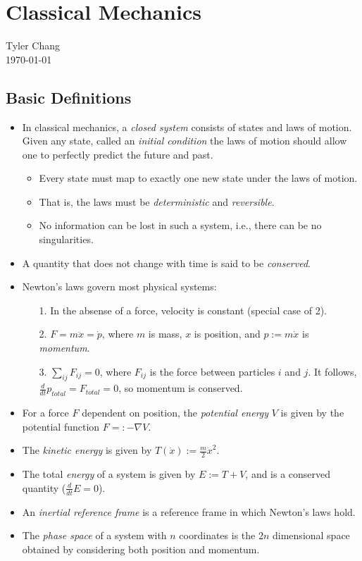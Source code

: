 \documentclass[12pt]{article}
\begin{document}
\section*{Classical Mechanics}
Tyler Chang\\
\today

\subsection*{Basic Definitions}

\begin{itemize}
\item In classical mechanics, a {\it closed system} consists of states and
laws of motion. Given any state, called an {\it initial condition} the laws
of motion should allow one to perfectly predict the future and past.
\begin{itemize}
\item Every state must map to exactly one new state under the laws of motion.
\item That is, the laws must be {\it deterministic} and {\it reversible}.
\item No information can be lost in such a system, i.e., there can be no
singularities.
\end{itemize}
\item A quantity that does not change with time is said to be {\it conserved}.
\item Newton's laws govern most physical systems:
\begin{enumerate}
\item[1.] In the absense of a force, velocity is constant (special case of 2).
\item[2.] $F = m\ddot{x} = \dot{p}$, where $m$ is mass, $x$ is position,
and $p:=m\dot{x}$ is {\it momentum}.
\item[3.] $\sum_{ij} F_{ij} = 0$, where $F_{ij}$ is the force between particles
$i$ and $j$.
It follows, $\frac{d}{dt} p_{total} = F_{total} = 0$, so momentum is conserved.
\end{enumerate}
\item For a force $F$ dependent on position, the {\it potential energy} $V$ is 
given by the potential function $F =: -\nabla V$.
\item The {\it kinetic energy} is given by $T(\dot{x}) := \frac{m}{2}\dot{x}^2$.
\item The total {\it energy} of a system is given by $E := T + V$, and is 
a conserved quantity ($\frac{d}{dt} E = 0$).
\item An {\it inertial reference frame} is a reference frame in which
Newton's laws hold.
\item The {\it phase space} of a system with $n$ coordinates is the 
$2n$ dimensional space obtained by considering both position and momentum.
\end{itemize}
\end{document}
